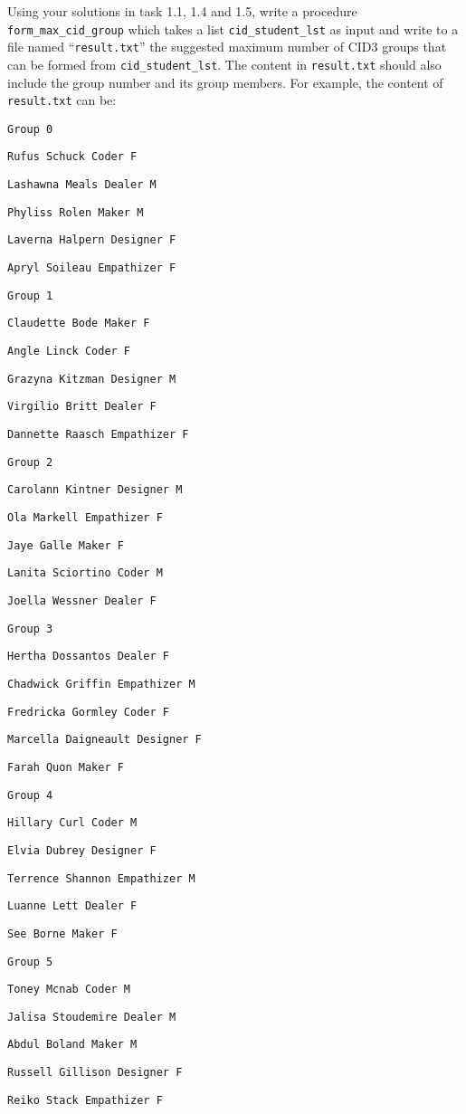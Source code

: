Using your solutions in task 1.1, 1.4 and 1.5, write a procedure \texttt{form\_max\_cid\_group}
which takes a list \texttt{cid\_student\_lst} as input and write to
a file named \textquotedblleft \texttt{result.txt}\textquotedblright{}
the suggested maximum number of CID3 groups that can be formed from
\texttt{cid\_student\_lst}. The content in \textquotedbl\texttt{result.txt}\textquotedbl{}
should also include the group number and its group members. For example,
the content of \textquotedbl\texttt{result.txt}\textquotedbl{} can
be: 

\noindent %
\noindent\begin{minipage}[t]{1\columnwidth}%
\texttt{Group 0}

\texttt{Rufus Schuck Coder F}

\texttt{Lashawna Meals Dealer M}

\texttt{Phyliss Rolen Maker M }

\texttt{Laverna Halpern Designer F }

\texttt{Apryl Soileau Empathizer F }

\texttt{Group 1 }

\texttt{Claudette Bode Maker F }

\texttt{Angle Linck Coder F }

\texttt{Grazyna Kitzman Designer M }

\texttt{Virgilio Britt Dealer F }

\texttt{Dannette Raasch Empathizer F }

\texttt{Group 2 }

\texttt{Carolann Kintner Designer M }

\texttt{Ola Markell Empathizer F }

\texttt{Jaye Galle Maker F }

\texttt{Lanita Sciortino Coder M}

\texttt{Joella Wessner Dealer F }

\texttt{Group 3 }

\texttt{Hertha Dossantos Dealer F }

\texttt{Chadwick Griffin Empathizer M }

\texttt{Fredricka Gormley Coder F }

\texttt{Marcella Daigneault Designer F}

\texttt{Farah Quon Maker F}

\texttt{Group 4 }

\texttt{Hillary Curl Coder M }

\texttt{Elvia Dubrey Designer F}

\texttt{Terrence Shannon Empathizer M }

\texttt{Luanne Lett Dealer F }

\texttt{See Borne Maker F }

\texttt{Group 5 }

\texttt{Toney Mcnab Coder M }

\texttt{Jalisa Stoudemire Dealer M }

\texttt{Abdul Boland Maker M }

\texttt{Russell Gillison Designer F }

\texttt{Reiko Stack Empathizer F}%
\end{minipage}

